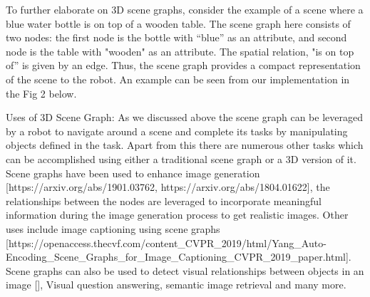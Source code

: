 To further elaborate on 3D scene graphs, consider the example of a scene where a blue water bottle is on top of a wooden table. 
The scene graph here consists of two nodes: 
the first node is the bottle with “blue” as an attribute, and second node is the table with "wooden" as an attribute. The spatial relation, 
"is on top of” is given by an edge. Thus, the scene graph provides a compact representation of the scene to the robot. 
An example can be seen from our implementation in the Fig 2 below.

Uses of 3D Scene Graph:
As we discussed above the scene graph can be leveraged by a robot to navigate around a scene and complete its tasks by manipulating objects defined in the task. 
Apart from this there are numerous other tasks which can be accomplished using either a traditional scene graph or a 3D version of it. 
Scene graphs have been used to enhance image generation [https://arxiv.org/abs/1901.03762, https://arxiv.org/abs/1804.01622], 
the relationships between the nodes are leveraged to incorporate meaningful information during the image generation process to get realistic images.
 Other uses include image captioning using scene graphs 
 [https://openaccess.thecvf.com/content_CVPR_2019/html/Yang_Auto-Encoding_Scene_Graphs_for_Image_Captioning_CVPR_2019_paper.html]. 
 Scene graphs can also be used to detect visual relationships between objects in an image [], Visual question answering, semantic image retrieval and many more.

